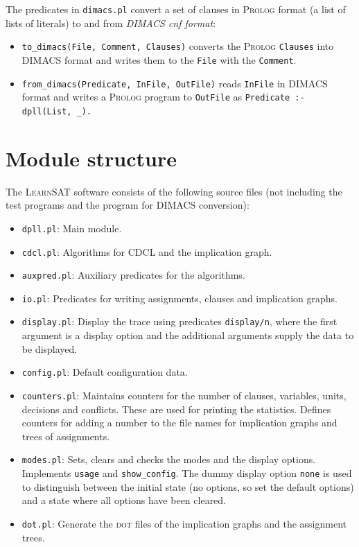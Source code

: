 \documentclass[11pt]{article}
\newcommand*{\p}[1]{\textup{\texttt{#1}}}
\newcommand*{\ls}{\textsc{LearnSAT}}
\newcommand*{\pl}{\textsc{Prolog}}
\newcommand*{\dt}{\textsc{dot}}
\begin{document}
The predicates in \p{dimacs.pl} convert a set of clauses in
\pl{} format (a list of lists of literals) to and from \emph{DIMACS cnf
format}:
\begin{itemize}
\item \p{to\_dimacs(File, Comment, Clauses)} converts the \pl{}
\p{Clauses} into DIMACS format and writes them to the \p{File} with the
\p{Comment}.
\item \p{from\_dimacs(Predicate, InFile, OutFile)} reads \p{InFile} in
DIMACS format and writes a \pl{} program to \p{OutFile} as
\verb+Predicate :- dpll(List, _).+
\end{itemize}


\section{Module structure}\label{s.module}

The \ls{} software consists of the following source files (not including the test programs and the program for DIMACS conversion):

\begin{itemize}
\item \p{dpll.pl}: Main module.

\item \p{cdcl.pl}: Algorithms for CDCL and the implication graph.

\item \p{auxpred.pl}: Auxiliary predicates for the algorithms. 

\item \p{io.pl}: Predicates for writing assignments, clauses and
implication graphs.

\item \p{display.pl}: Display the trace using predicates \p{display/n},
where the first argument is a display option and the additional
arguments supply the data to be displayed.

\item \p{config.pl}: Default configuration data.

\item \p{counters.pl}: Maintains counters for the number of clauses, variables, units, decisions and conflicts. These are used for printing the statistics. Defines counters for adding a number to the file names for implication graphs and trees of assignments.

\item \p{modes.pl}: Sets, clears and checks the modes and the display options. Implements \p{usage} and \p{show\_config}. The dummy display option \p{none} is used to distinguish between the initial state (no options, so set the default options) and a state where all options have been cleared.

\item \p{dot.pl}: Generate the \dt{} files of the implication graphs
and the assignment trees.
\end{itemize}
\end{document}
